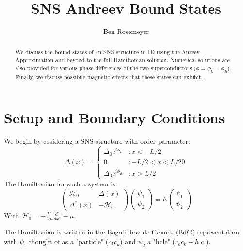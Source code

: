 \documentclass[a4paper,11pt]{article}
\title{SNS Andreev Bound States}
\author{Ben Rosemeyer}
\begin{document}
\maketitle
\tableofcontents

\begin{abstract}
We discuss the bound states of an SNS structure in 1D using the Anreev Approximation and beyond to the full Hamiltonian solution. Numerical solutions are also provided for various phase differences of the two superconductors ($\phi = \phi_L-\phi_R$). Finally, we discuss possibile magnetic effects that these states can exhibit.
\end{abstract}

\section*{Setup and Boundary Conditions}
We begin by cosidering a SNS structure with order parameter: \\

  \[\Delta(x)= \left\{
  \begin{array}{lr}
     \Delta_0 e^{i\phi_L}& : x < -L/2\\
     0 & : -L/2 < x < L/2  0\\
     \Delta_0 e^{i\phi_R} & : x > L/2 
  \end{array}
\right.
\]
The Hamiltonian for such a system is: \\
\begin{equation}
\left( \begin{array}{cc}
\mathcal{H}_0 & \Delta(x) \\
\Delta^*(x) & -\mathcal{H}_0 
 \end{array} \right)
 \left( \begin{array}{cc}
\psi_1 \\
\psi_2
 \end{array} \right) = E
  \left( \begin{array}{cc}
\psi_1 \\
\psi_2
 \end{array} \right)
\end{equation}
With $\mathcal{H}_0 = -\frac{\hbar^2}{2m}\frac{d^2}{dx^2} - \mu$.

The Hamiltonian is written in the Bogoliubov-de Gennes (BdG) representation with $\psi_1$ thought of as a "particle" ($c_k c^\dagger_k$) and $\psi_2$ a "hole" ($c_k c_k + h.c.$).
\end{document}
